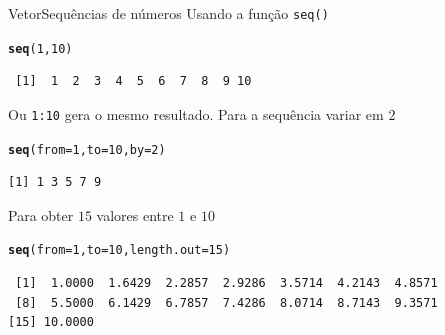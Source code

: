 \documentclass[10pt,handout]{beamer}\usepackage[]{graphicx}\usepackage[]{color}
\makeatletter
\newcommand{\hlnum}[1]{\textcolor[rgb]{0.686,0.059,0.569}{#1}}%
\newcommand{\hlstd}[1]{\textcolor[rgb]{0.345,0.345,0.345}{#1}}%
\newcommand{\hlkwc}[1]{\textcolor[rgb]{0.333,0.667,0.333}{#1}}%
\newcommand{\hlkwd}[1]{\textcolor[rgb]{0.282,0.239,0.545}{\textbf{#1}}}%
\newenvironment{kframe}{%
 \def\at@end@of@kframe{}%
 \ifinner\ifhmode%
  \def\at@end@of@kframe{\end{minipage}}%
  \begin{minipage}{\columnwidth}%
 \fi\fi%
 \def\FrameCommand##1{\hskip\@totalleftmargin \hskip-\fboxsep
 \colorbox{shadecolor}{##1}\hskip-\fboxsep
     \hskip-\linewidth \hskip-\@totalleftmargin \hskip\columnwidth}%
 \MakeFramed {\advance\hsize-\width
   \@totalleftmargin\z@ \linewidth\hsize
   \@setminipage}}%
 {\par\unskip\endMakeFramed%
 \at@end@of@kframe}
\newenvironment{knitrout}{}{} %
\makeatother
\begin{document}
\begin{frame}[fragile]{Vetor}{Sequências de números}
  Usando a função \verb|seq()|
\begin{knitrout}\small
{}\color{fgcolor}\begin{kframe}
\begin{alltt}
\hlkwd{seq}\hlstd{(}\hlnum{1}\hlstd{,} \hlnum{10}\hlstd{)}
\end{alltt}
\begin{verbatim}
 [1]  1  2  3  4  5  6  7  8  9 10
\end{verbatim}
\end{kframe}
\end{knitrout}

Ou \verb|1:10| gera o mesmo resultado. Para a sequência variar em $2$
\begin{knitrout}\small
{}\color{fgcolor}\begin{kframe}
\begin{alltt}
\hlkwd{seq}\hlstd{(}\hlkwc{from} \hlstd{=} \hlnum{1}\hlstd{,} \hlkwc{to} \hlstd{=} \hlnum{10}\hlstd{,} \hlkwc{by} \hlstd{=} \hlnum{2}\hlstd{)}
\end{alltt}
\begin{verbatim}
[1] 1 3 5 7 9
\end{verbatim}
\end{kframe}
\end{knitrout}

Para obter $15$ valores entre $1$ e $10$
\begin{knitrout}\small
{}\color{fgcolor}\begin{kframe}
\begin{alltt}
\hlkwd{seq}\hlstd{(}\hlkwc{from} \hlstd{=} \hlnum{1}\hlstd{,} \hlkwc{to} \hlstd{=} \hlnum{10}\hlstd{,} \hlkwc{length.out} \hlstd{=} \hlnum{15}\hlstd{)}
\end{alltt}
\begin{verbatim}
 [1]  1.0000  1.6429  2.2857  2.9286  3.5714  4.2143  4.8571
 [8]  5.5000  6.1429  6.7857  7.4286  8.0714  8.7143  9.3571
[15] 10.0000
\end{verbatim}
\end{kframe}
\end{knitrout}

\end{frame}
\end{document}

